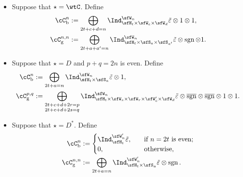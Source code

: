 \documentclass[12pt,a4paper]{amsart}
\newcommand{\Res}{\mathrm{Res}}
\newcommand{\sgn}{\operatorname{sgn}}
\numberwithin{equation}{section}
\theoremstyle{remark}
\def\Cint#1{\Coh_{[#1]}}
\def\bsgn{\overline{\sgn}}
\def\Coh{\mathrm{Coh}}
\begin{document}
\begin{itemize}
\[\begin{split}
        \end{split}
        \]
  \item Suppose that $\star=\wtC$. Define
        \[
        \begin{split}
          \cC_{\mathrm b}^{n} &
          :=\bigoplus_{\substack{2t+c+d=n}} %
          \Ind_{\sfH_{t} \times \sfW_c\times \sfW_{d}}^{\sfW_{n}}\tilde{\varepsilon}\otimes 1 \otimes
          1, %
          \\
          \cC_{\mathrm g}^{n,n} &:= \bigoplus_{2t+a+a'=n}\Ind_{\sfH_{t} \times \sfS_{a} \times \sfS_{a'}}^{\sfW_{n}}\tilde{\varepsilon} \otimes
          \sgn \otimes 1. \\
        \end{split}
        \]
  \item Suppose that $\star=D$ and $p+q=2n$ is even. Define
        \[
        \begin{split}
          \cC_{\mathrm b}^{n} & := \bigoplus_{\substack{2t+a=n}}
          \Ind_{\sfH_{t}\times \sfS_{a}}^{\sfW_{n}}\tilde{\varepsilon}\otimes 1,\\
          \cC_{\mathrm g}^{p,q} %
          & := \bigoplus_{\substack{2t+c+d+2r=p\\2t+c+d+2s=q}}
          \Ind_{\sfH_{t} \times \sfW_s\times \sfW_r\times \sfW'_{c}\times \sfW_{d} }^{\sfW_{n}}\tilde{\varepsilon} \otimes \bsgn \otimes \bsgn \otimes 1\otimes
          1. %
          \\
        \end{split}
        \]
  \item Suppose that $\star=D^{*}$. Define
        \[
        \begin{split}
          \cC_{\mathrm b}^{n} & :=
          \begin{cases}
            \Ind_{\sfH_{t}}^{\sfW'_{n}}\tilde{\varepsilon}, &\quad 
            \text{if $n=2t$ is even}; \\
            0, & \quad \text{otherwise},\\
          \end{cases}\\
          \cC_{\mathrm g}^{n,n} %
          &:=\bigoplus_{\substack{2t+a=n}} \Ind_{\sfH_{t} \times \sfS_{a}}^{\sfW'_{n}}
         \tilde{\varepsilon} \otimes \sgn. \\
        \end{split}
        \]
\end{itemize}
\end{document}
